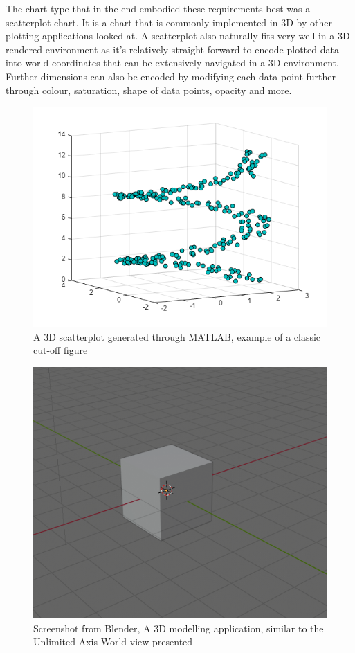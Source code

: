 The chart type that in the end embodied these requirements best was a scatterplot chart. It is a chart that is commonly implemented in 3D by other plotting applications looked at. A scatterplot also naturally fits very well in a 3D rendered environment as it's relatively straight forward to encode plotted data into world coordinates that can be extensively navigated in a 3D environment. Further dimensions can also be encoded by modifying each data point further through colour, saturation, shape of data points, opacity and more.

\begin{figure}[h]
    \centering
    \includegraphics[width=0.7\columnwidth]{author-files/figures/SetMarkerPropertiesExample_01_MATLAB.png}
    \caption{A 3D scatterplot generated through MATLAB, example of a classic cut-off figure}
    \label{fig:MatlabPlot}
\end{figure}

\begin{figure}[h]
    \centering
    \includegraphics[width=0.7\columnwidth]{author-files/figures/worldnavblender.png}
    \caption{Screenshot from Blender, A 3D modelling application, similar to the Unlimited Axis World view presented}
    \label{fig:MatlabPlot}
\end{figure}

